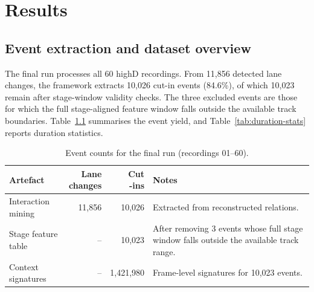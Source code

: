 \documentclass[12pt,a4paper,twoside,openright]{report}
\begin{document}
    \chapter{Results}
    \label{chap:results}

    \section{Event extraction and dataset overview}
    The final run processes all 60 highD recordings. From 11,856 detected lane changes, the framework extracts 10,026 cut-in events (84.6\%), of which 10,023 remain after stage-window validity checks. The three excluded events are those for which the full stage-aligned feature window falls outside the available track boundaries. Table~\ref{tab:events} summarises the event yield, and Table~\ref{tab:duration-stats} reports duration statistics.

    \begin{table}[H]
        \centering
        \caption{Event counts for the final run (recordings 01--60).}
        \label{tab:events}
        {\small
        \setlength{\tabcolsep}{4pt}
            \begin{tabularx}{\textwidth}{@{}>{\raggedright\arraybackslash}p{}rr>{\raggedright\arraybackslash}p{}@{}}
\toprule
Artefact & \shortstack{Lane\\changes} & \shortstack{Cut\\-ins} & Notes \\
\midrule
Interaction mining & 11,856 & 10,026 & Extracted from reconstructed relations. \\
Stage feature table & -- & 10,023 & After removing 3 events whose full stage window falls outside the available track range. \\
Context signatures & -- & 1,421,980 & Frame-level signatures for 10,023 events. \\
\bottomrule
            \end{tabularx}
        }
    \end{table}
\end{document}
